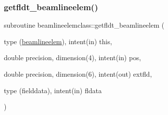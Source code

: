 \subsubsection{\texorpdfstring{getfldt\_beamlineelem()}{getfldt\_beamlineelem()}}
{\footnotesize\ttfamily subroutine beamlineelemclass\+::getfldt\+\_\+beamlineelem (\begin{DoxyParamCaption}\item[{type (\mbox{\hyperlink{namespacebeamlineelemclass_structbeamlineelemclass_1_1beamlineelem}{beamlineelem}}), intent(in)}]{this,  }\item[{double precision, dimension(4), intent(in)}]{pos,  }\item[{double precision, dimension(6), intent(out)}]{extfld,  }\item[{type (fielddata), intent(in)}]{fldata }\end{DoxyParamCaption})}

